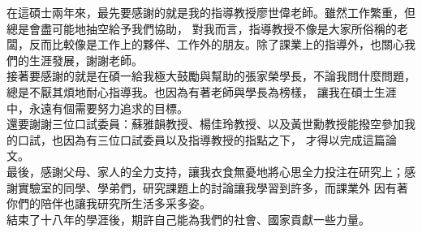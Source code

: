 \begin{acknowledgementsCH}

\setlength{\baselineskip}{1.5em}

%

在這碩士兩年來，最先要感謝的就是我的指導教授廖世偉老師。雖然工作繁重，但總是會盡可能地抽空給予我們協助，%
對我而言，指導教授不像是大家所俗稱的老闆，反而比較像是工作上的夥伴、工作外的朋友。除了課業上的指導外，也關心我們的生涯發展，謝謝老師。\\%

接著要感謝的就是在碩一給我極大鼓勵與幫助的張家榮學長，不論我問什麼問題，總是不厭其煩地耐心指導我。也因為有著老師與學長為榜樣，%
讓我在碩士生涯中，永遠有個需要努力追求的目標。\\%

還要謝謝三位口試委員：蘇雅韻教授、楊佳玲教授、以及黃世勳教授能撥空參加我的口試，也因為有三位口試委員以及指導教授的指點之下，%
才得以完成這篇論文。\\%

最後，感謝父母、家人的全力支持，讓我衣食無憂地將心思全力投注在研究上；感謝實驗室的同學、學弟們，研究課題上的討論讓我學習到許多，而課業外%
因有著你們的陪伴也讓我研究所生活多采多姿。\\%

結束了十八年的學涯後，期許自己能為我們的社會、國家貢獻一些力量。%
\end{acknowledgementsCH}

